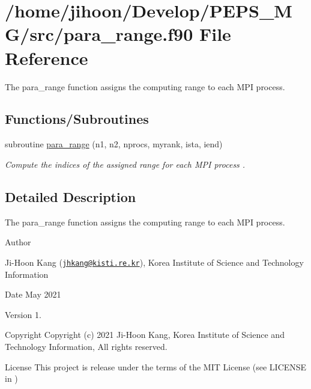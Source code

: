 \hypertarget{para__range_8f90}{}\section{/home/jihoon/\+Develop/\+P\+E\+P\+S\+\_\+\+M\+G/src/para\+\_\+range.f90 File Reference}
\label{para__range_8f90}


The para\+\_\+range function assigns the computing range to each M\+PI process.  


\subsection*{Functions/\+Subroutines}
\begin{DoxyCompactItemize}
\item 
subroutine \hyperlink{para__range_8f90_ab75ab386311975aa4ff7cac06798fcd4}{para\+\_\+range} (n1, n2, nprocs, myrank, ista, iend)
\begin{DoxyCompactList}\small\item\em Compute the indices of the assigned range for each M\+PI process . \end{DoxyCompactList}\end{DoxyCompactItemize}


\subsection{Detailed Description}
The para\+\_\+range function assigns the computing range to each M\+PI process. 

\begin{DoxyAuthor}{Author}

\begin{DoxyItemize}
\item Ji-\/\+Hoon Kang (\href{mailto:jhkang@kisti.re.kr}{\tt jhkang@kisti.\+re.\+kr}), Korea Institute of Science and Technology Information
\end{DoxyItemize}
\end{DoxyAuthor}
\begin{DoxyDate}{Date}
May 2021 
\end{DoxyDate}
\begin{DoxyVersion}{Version}
1. 
\end{DoxyVersion}
\begin{DoxyParagraph}{Copyright}
Copyright (c) 2021 Ji-\/\+Hoon Kang, Korea Institute of Science and Technology Information, All rights reserved. 
\end{DoxyParagraph}
\begin{DoxyParagraph}{License }
This project is release under the terms of the M\+IT License (see L\+I\+C\+E\+N\+SE in ) 
\end{DoxyParagraph}


